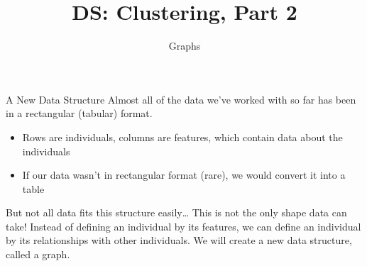 \documentclass[aspectratio=169]{../latex_main/tntbeamer}  %
\title[Introduction]{DS: Clustering, Part 2}
\subtitle{Graphs}
\begin{document}
	
	\maketitle
	\begin{frame}{A New Data Structure}
	    Almost all of the data we’ve worked with so far has been in a rectangular (tabular) format.
	    \begin{itemize}
	        \item Rows are individuals, columns are features, which contain data about the individuals
	        \item If our data wasn’t in rectangular format (rare), we would convert it into a table
	    \end{itemize}
	    \bigskip
	    But not all data fits this structure easily… This is not the only shape data can take!
	    \bigskip
	    Instead of defining an individual by its features, we can define an individual by its relationships with other individuals. We will create a new data structure, called a graph.
	\end{frame}
	
\end{document}
